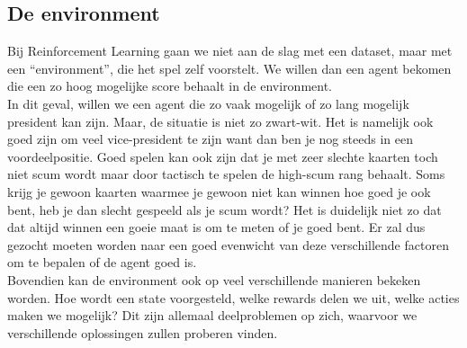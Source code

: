 \documentclass[11pt]{article}
\begin{document}
\subsection{De environment}
Bij Reinforcement Learning gaan we niet aan de slag met een dataset, maar met een “environment”, die het spel zelf voorstelt. We willen dan een agent bekomen die een zo hoog mogelijke score behaalt in de environment. \\
In dit geval, willen we een agent die zo vaak mogelijk of zo lang mogelijk president kan zijn. Maar, de situatie is niet zo zwart-wit. Het is namelijk ook goed zijn om veel vice-president te zijn want dan ben je nog steeds in een voordeelpositie. Goed spelen kan ook zijn dat je met zeer slechte kaarten toch niet scum wordt maar door tactisch te spelen de high-scum rang behaalt. Soms krijg je gewoon kaarten waarmee je gewoon niet kan winnen hoe goed je ook bent, heb je dan slecht gespeeld als je scum wordt? Het is duidelijk niet zo dat dat altijd winnen een goeie maat is om te meten of je goed bent. Er zal dus gezocht moeten worden naar een goed evenwicht van deze verschillende factoren om te bepalen of de agent goed is. \\
Bovendien kan de environment ook op veel verschillende manieren bekeken worden. Hoe wordt een state voorgesteld, welke rewards delen we uit, welke acties maken we mogelijk? Dit zijn allemaal deelproblemen op zich, waarvoor we verschillende oplossingen zullen proberen vinden.\\\\
\end{document}
